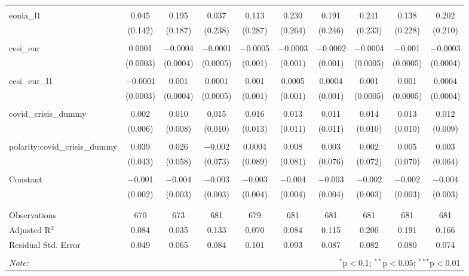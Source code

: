 \begin{table}[!htbp]
\begin{adjustbox}{width=1.25\textwidth}
\begin{tabular}{@{\extracolsep{5pt}}lccccccccc}
  & & & & & & & & & \\ 
 eonia\_l1 & 0.045 & 0.195 & 0.037 & 0.113 & 0.230 & 0.191 & 0.241 & 0.138 & 0.202 \\ 
  & (0.142) & (0.187) & (0.238) & (0.287) & (0.264) & (0.246) & (0.233) & (0.228) & (0.210) \\ 
  & & & & & & & & & \\ 
 cesi\_eur & 0.0001 & $-$0.0004 & $-$0.0001 & $-$0.0005 & $-$0.0003 & $-$0.0002 & $-$0.0004 & $-$0.001 & $-$0.0003 \\ 
  & (0.0003) & (0.0004) & (0.0005) & (0.001) & (0.001) & (0.001) & (0.0005) & (0.0005) & (0.0004) \\ 
  & & & & & & & & & \\ 
 cesi\_eur\_l1 & $-$0.0001 & 0.001 & 0.0001 & 0.001 & 0.0005 & 0.0004 & 0.001 & 0.001 & 0.0004 \\ 
  & (0.0003) & (0.0004) & (0.0005) & (0.001) & (0.001) & (0.001) & (0.0005) & (0.0005) & (0.0004) \\ 
  & & & & & & & & & \\ 
 covid\_crisis\_dummy & 0.002 & 0.010 & 0.015 & 0.016 & 0.013 & 0.011 & 0.014 & 0.013 & 0.012 \\ 
  & (0.006) & (0.008) & (0.010) & (0.013) & (0.011) & (0.011) & (0.010) & (0.010) & (0.009) \\ 
  & & & & & & & & & \\ 
 polarity:covid\_crisis\_dummy & 0.039 & 0.026 & $-$0.002 & 0.0004 & 0.008 & 0.003 & 0.002 & 0.005 & 0.003 \\ 
  & (0.043) & (0.058) & (0.073) & (0.089) & (0.081) & (0.076) & (0.072) & (0.070) & (0.064) \\ 
  & & & & & & & & & \\ 
 Constant & $-$0.001 & $-$0.004 & $-$0.003 & $-$0.003 & $-$0.004 & $-$0.003 & $-$0.002 & $-$0.002 & $-$0.004 \\ 
  & (0.002) & (0.003) & (0.003) & (0.004) & (0.004) & (0.004) & (0.003) & (0.003) & (0.003) \\ 
  & & & & & & & & & \\ 
\hline \\[-1.8ex] 
Observations & 670 & 673 & 681 & 679 & 681 & 681 & 681 & 681 & 681 \\ 
Adjusted R$^{2}$ & 0.084 & 0.035 & 0.133 & 0.070 & 0.084 & 0.115 & 0.200 & 0.191 & 0.166 \\ 
Residual Std. Error & 0.049 & 0.065 & 0.084 & 0.101 & 0.093 & 0.087 & 0.082 & 0.080 & 0.074 \\ 
\hline 
\hline \\[-1.8ex] 
\textit{Note:}  & \multicolumn{9}{r}{$^{*}$p$<$0.1; $^{**}$p$<$0.05; $^{***}$p$<$0.01} \\ 
\end{tabular} 
\end{adjustbox} 
\end{table} 
